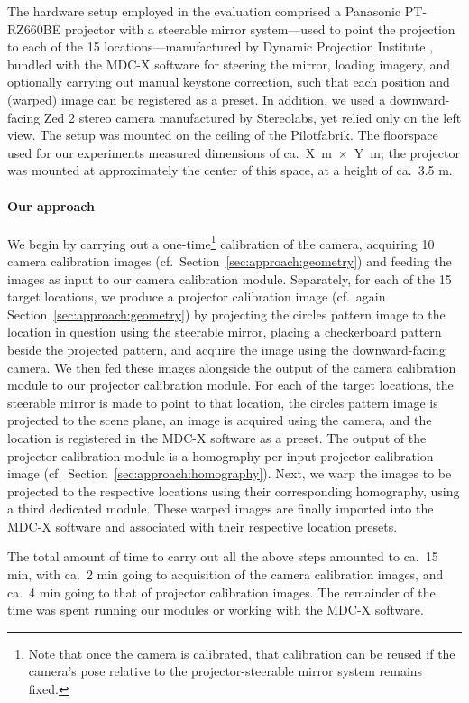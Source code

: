 \documentclass[review]{elsarticle}
\begin{document}
The hardware setup employed in the evaluation comprised a Panasonic PT-RZ660BE projector with a steerable mirror system---used to point the projection to each of the 15 locations---manufactured by Dynamic Projection Institute \cite{rupprecht2020information}, bundled with the MDC-X software for steering the mirror, loading imagery, and optionally carrying out manual keystone correction, such that each position and (warped) image can be registered as a preset. In addition, we used a downward-facing Zed 2 stereo camera manufactured by Stereolabs, yet relied only on the left view. The setup was mounted on the ceiling of the Pilotfabrik. The floorspace used for our experiments measured dimensions of ca.\ X~m~$\times$~Y~m; the projector was mounted at approximately the center of this space, at a height of ca.\ 3.5 m.

\paragraph{Our approach} We begin by carrying out a one-time\footnote{Note that once the camera is calibrated, that calibration can be reused if the camera's pose relative to the projector-steerable mirror system remains fixed.} calibration of the camera, acquiring 10 camera calibration images (cf.\ Section~\ref{sec:approach:geometry}) and feeding the images as input to our camera calibration module. Separately, for each of the 15 target locations, we produce a projector calibration image (cf.\ again Section~\ref{sec:approach:geometry}) by projecting the circles pattern image to the location in question using the steerable mirror, placing a checkerboard pattern beside the projected pattern, and acquire the image using the downward-facing camera. We then fed these images alongside the output of the camera calibration module to our projector calibration module. For each of the target locations, the steerable mirror is made to point to that location, the circles pattern image is projected to the scene plane, an image is acquired using the camera, and the location is registered in the MDC-X software as a preset. The output of the projector calibration module is a homography per input projector calibration image (cf.\ Section~\ref{sec:approach:homography}). Next, we warp the images to be projected to the respective locations using their corresponding homography, using a third dedicated module. These warped images are finally imported into the MDC-X software and associated with their respective location presets.

The total amount of time to carry out all the above steps amounted to ca.\ 15 min, with ca.\ 2 min going to acquisition of the camera calibration images, and ca.\ 4 min going to that of projector calibration images. The remainder of the time was spent running our modules or working with the MDC-X software.
\end{document}
